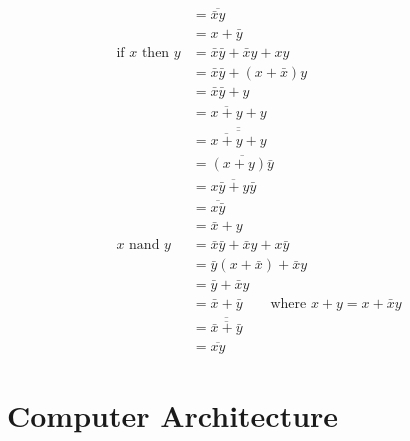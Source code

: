 \documentclass[a4paper]{book}
\begin{document}
\begin{align*}
    &                              = \overline{ \bar{x}y } \\
    &                              = x + \bar{y} \\
%
%
    \text{if } x \text{ then } y & = \bar{x}\bar{y} + \bar{x}y + xy \\
    &                              = \bar{x}\bar{y} + (x + \bar{x}) y \\
    &                              = \bar{x}\bar{y} + y \\
    &                              = \overline{x + y} + y \\
    &                              = \overline{ \overline{ \overline{x + y} + y} } \\
    &                              = \overline{ (x + y) \bar{y} } \\
    &                              = \overline{ x\bar{y} + y\bar{y} } \\
    &                              = \overline{ x \bar{y} } \\
    &                              = \bar{x} + y \\
%
%
    x \text{ nand } y & = \bar{x}\bar{y} + \bar{x}y + x \bar{y} \\
    &                   = \bar{y}(x + \bar{x}) + \bar{x} y \\
    &                   = \bar{y} + \bar{x} y \\
    &                   = \bar{x} + \bar{y} \text{~ ~ ~ where } x + y    = x + \bar{x}y \\
    &                   = \overline{ \overline{ \bar{x} + \bar{y} } } \\
    &                   = \overline{ xy }
\end{align*}







\setcounter{chapter}{4}
\chapter{Computer Architecture}
\end{document}
